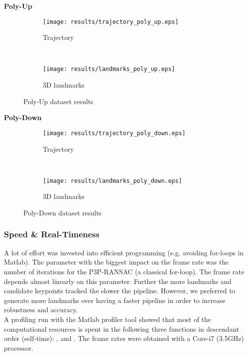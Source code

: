 \textbf{Poly-Up}
\begin{figure*}[ht!]
    \centering
    \begin{subfigure}[t]{0.5\textwidth}
        \centering
        \texttt{[image: results/trajectory\_poly\_up.eps]}
        \caption{Trajectory}
    \end{subfigure}%
    ~ 
    \begin{subfigure}[t]{0.5\textwidth}
        \centering
        \texttt{[image: results/landmarks\_poly\_up.eps]}
        \caption{3D landmarks}
    \end{subfigure}
    \caption{Poly-Up dataset results}
		\label{poly_up_result_fig}
\end{figure*}

\textbf{Poly-Down}
\begin{figure*}[ht!]
    \centering
    \begin{subfigure}[t]{0.5\textwidth}
        \centering
        \texttt{[image: results/trajectory\_poly\_down.eps]}
        \caption{Trajectory}
    \end{subfigure}%
    ~ 
    \begin{subfigure}[t]{0.5\textwidth}
        \centering
        \texttt{[image: results/landmarks\_poly\_down.eps]}
        \caption{3D landmarks}
    \end{subfigure}
    \caption{Poly-Down dataset results}
		\label{poly_down_result_fig}
\end{figure*}

\subsubsection{Speed \& Real-Timeness}
A lot of effort was invested into efficient programming (e.g. avoiding for-loops in Matlab). The parameter with the biggest impact on the frame rate was the number of iterations for the P3P-RANSAC (a classical for-loop). The frame rate depends almost linearly on this parameter. Further the more landmarks and candidate keypoints tracked the slower the pipeline. However, we preferred to generate more landmarks over having a faster pipeline in order to increase robustness and accuracy.\\

A profiling run with the Matlab profiler tool showed that most of the computational resources is spent in the following three functions in descendant order (self-time): ,  and . The frame rates were obtained with a Core-i7 (3.5GHz) processor.

